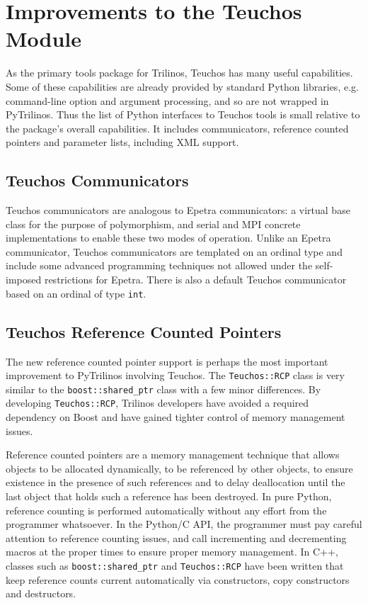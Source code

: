 \documentclass[11pt]{article}
\begin{document}
\section{Improvements to the Teuchos Module}
\label{sec:teuchos}

As the primary tools package for Trilinos, Teuchos has many useful capabilities.  Some of these capabilities are already provided by standard Python libraries, e.g. command-line option and argument processing, and so are not wrapped in PyTrilinos.  Thus the list of Python interfaces to Teuchos tools is small relative to the package's overall capabilities.  It includes communicators, reference counted pointers and parameter lists, including XML support.

\subsection{Teuchos Communicators}
\label{sec:teuchos_communicators}

Teuchos communicators are analogous to Epetra communicators: a virtual base class for the purpose of polymorphism, and serial and MPI concrete implementations to enable these two modes of operation.  Unlike an Epetra communicator, Teuchos communicators are templated on an ordinal type and include some advanced programming techniques not allowed under the self-imposed restrictions for Epetra.  There is also a default Teuchos communicator based on an ordinal of type {\tt int}.

\subsection{Teuchos Reference Counted Pointers}
\label{sec:teuchos_rcp}

The new reference counted pointer support is perhaps the most important improvement to PyTrilinos involving Teuchos.  The {\tt Teuchos::RCP} class is very similar to the {\tt boost::shared\_ptr} class with a few minor differences.  By developing {\tt Teuchos::RCP}, Trilinos developers have avoided a required dependency on Boost and have gained tighter control of memory management issues.

Reference counted pointers are a memory management technique that allows objects to be allocated dynamically, to be referenced by other objects, to ensure existence in the presence of such references and to delay deallocation until the last object that holds such a reference has been destroyed.  In pure Python, reference counting is performed automatically without any effort from the programmer whatsoever.  In the Python/C API, the programmer must pay careful attention to reference counting issues, and call incrementing and decrementing macros at the proper times to ensure proper memory management.  In C++, classes such as {\tt boost::shared\_ptr} and {\tt Teuchos::RCP} have been written that keep reference counts current automatically via constructors, copy constructors and destructors.
\end{document}
